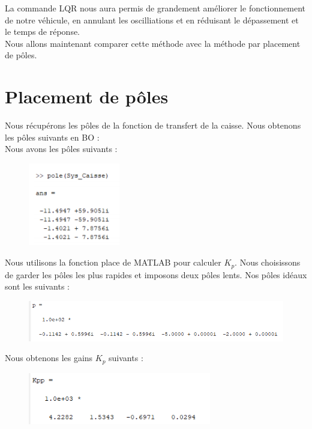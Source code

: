 \documentclass[a4paper,12pt]{insa} %
\begin{document}
La commande LQR nous aura permis de grandement améliorer le fonctionnement de notre véhicule, en annulant les oscilliations et en réduisant le dépassement et le temps de réponse.\\
Nous allons maintenant comparer cette méthode avec la méthode par placement de pôles.

\section{Placement de pôles}
 
 Nous récupérons les pôles de la fonction de transfert de la caisse. Nous obtenons les pôles suivants en BO : \\
 Nous avons les pôles suivants : \\
 \begin{center}
    \begin{figure}[H]
        \centering
        \includegraphics[width=4cm, keepaspectratio]{figures/poles_orig.png}
    \end{figure}
\end{center}
Nous utilisons la fonction place de MATLAB pour calculer $K_p$. Nous choisissons de garder les pôles les plus rapides et imposons deux pôles lents. Nos pôles idéaux sont les suivants : 
 \begin{center}
    \begin{figure}[H]
        \centering
        \includegraphics[width=12cm, keepaspectratio]{figures/poles.png}
    \end{figure}
\end{center}
Nous obtenons les gains $K_p$ suivants : \\
 \begin{center}
    \begin{figure}[H]
        \centering
        \includegraphics[width=8cm, keepaspectratio]{figures/kpp.png}
    \end{figure}
\end{center}
\end{document}
